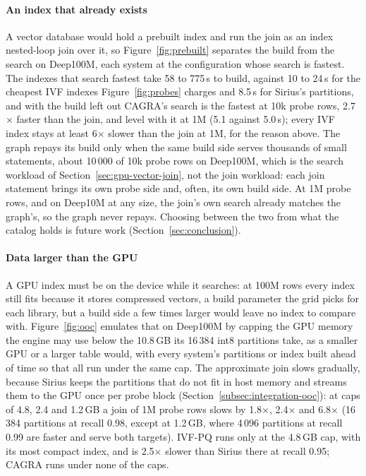 \paragraph{An index that already exists}

A vector database would hold a prebuilt index and run the join as an index nested-loop join over it, so Figure~\ref{fig:prebuilt} separates the build from the search on Deep100M, each system at the configuration whose search is fastest.
The indexes that search fastest take 58 to 775\,s to build, against 10 to 24\,s for the cheapest IVF indexes Figure~\ref{fig:probes} charges and 8.5\,s for Sirius's partitions, and with the build left out CAGRA's search is the fastest at 10k probe rows, 2.7$\times$ faster than the join, and level with it at 1M (5.1 against 5.0\,s); every IVF index stays at least 6$\times$ slower than the join at 1M, for the reason above.
The graph repays its build only when the same build side serves thousands of small statements, about 10\,000 of 10k probe rows on Deep100M, which is the search workload of Section~\ref{sec:gpu-vector-join}, not the join workload: each join statement brings its own probe side and, often, its own build side.
At 1M probe rows, and on Deep10M at any size, the join's own search already matches the graph's, so the graph never repays.
Choosing between the two from what the catalog holds is future work (Section~\ref{sec:conclusion}).

\paragraph{Data larger than the GPU}

A GPU index must be on the device while it searches: at 100M rows every index still fits because it stores compressed vectors, a build parameter the grid picks for each library, but a build side a few times larger would leave no index to compare with.
Figure~\ref{fig:ooc} emulates that on Deep100M by capping the GPU memory the engine may use below the 10.8\,GB its 16\,384 int8 partitions take, as a smaller GPU or a larger table would, with every system's partitions or index built ahead of time so that all run under the same cap.
The approximate join slows gradually, because Sirius keeps the partitions that do not fit in host memory and streams them to the GPU once per probe block (Section~\ref{subsec:integration-ooc}): at caps of 4.8, 2.4 and 1.2\,GB a join of 1M probe rows slows by 1.8$\times$, 2.4$\times$ and 6.8$\times$ (16\,384 partitions at recall 0.98, except at 1.2\,GB, where 4\,096 partitions at recall 0.99 are faster and serve both targets).
IVF-PQ runs only at the 4.8\,GB cap, with its most compact index, and is 2.5$\times$ slower than Sirius there at recall 0.95; CAGRA runs under none of the caps.

